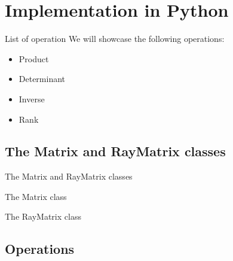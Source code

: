 \documentclass{beamer}
\begin{document}
\section{Implementation in Python}
\begin{frame}{List of operation}
    We will showcase the following operations:
    \begin{itemize}
        \item{Product}
        \item{Determinant}
        \item{Inverse}
        \item{Rank}
    \end{itemize}
\end{frame}

\subsection{The Matrix and RayMatrix classes}
\begin{frame}{The Matrix and RayMatrix classes}

\end{frame}

\begin{frame}{The Matrix class}

\end{frame}

\begin{frame}{The RayMatrix class}

\end{frame}

\subsection{Operations}
\end{document}
